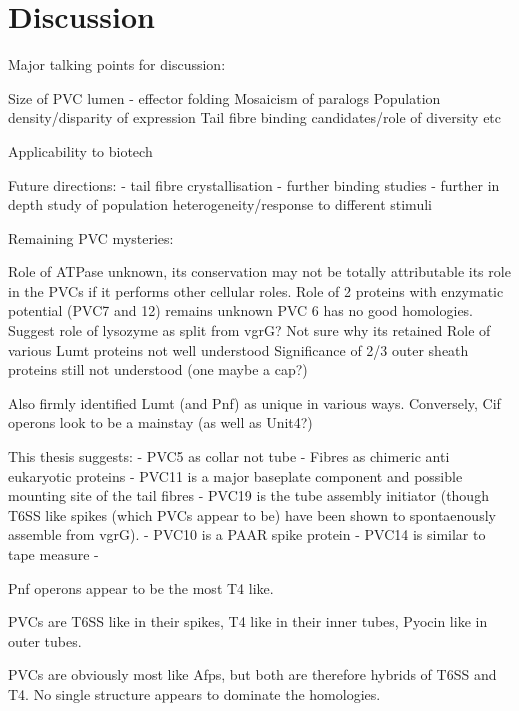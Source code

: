 \pagestyle{IHA-fancy-style}


\chapter{Discussion}\label{Discussion}

Major talking points for discussion:

Size of PVC lumen - effector folding
Mosaicism of paralogs
Population density/disparity of expression
Tail fibre binding candidates/role of diversity etc

Applicability to biotech


Future directions:
	- tail fibre crystallisation
	- further binding studies
	- further in depth study of population heterogeneity/response to different stimuli
	

Remaining PVC mysteries:

Role of ATPase unknown, its conservation may not be totally attributable its role in the PVCs if it performs other cellular roles.
Role of 2 proteins with enzymatic potential (PVC7 and 12) remains unknown
PVC 6 has no good homologies.
Suggest role of lysozyme as split from vgrG? Not sure why its retained
Role of various Lumt proteins not well understood
Significance of 2/3 outer sheath proteins still not understood (one maybe a cap?)

Also firmly identified Lumt (and Pnf) as unique in various ways. Conversely, Cif operons look to be a mainstay (as well as Unit4?)


This thesis suggests:
 - PVC5 as collar not tube
 - Fibres as chimeric anti eukaryotic proteins
 - PVC11 is a major baseplate component and possible mounting site of the tail fibres
 - PVC19 is the tube assembly initiator (though T6SS like spikes (which PVCs appear to be) have been shown to spontaenously assemble from vgrG).
 - PVC10 is a PAAR spike protein
 - PVC14 is similar to tape measure
 - 
 
 
 Pnf operons appear to be the most T4 like.
 
 
PVCs are T6SS like in their spikes, T4 like in their inner tubes, Pyocin like in outer tubes.

PVCs are obviously most like Afps, but both are therefore hybrids of T6SS and T4. No single structure appears to dominate the homologies.